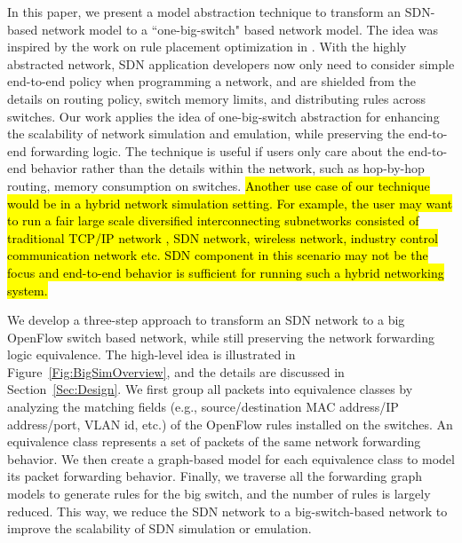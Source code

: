 In this paper, we present a model abstraction technique to transform an SDN-based network model to a ``one-big-switch" based network model.
The idea was inspired by the work on rule placement optimization in \cite{OneBigSwitchAbstraction}.
With the highly abstracted network, SDN application developers now only need to consider
simple end-to-end policy when programming a network,
and are shielded from the details on routing policy, switch memory limits,
and distributing rules across switches.
Our work applies the idea of one-big-switch abstraction for enhancing the scalability
of network simulation and emulation, while preserving the end-to-end forwarding logic.
The technique is useful if users only care about the end-to-end behavior rather than
the details within the network, such as hop-by-hop routing, memory consumption on switches.
\hl{
Another use case of our technique would be in a hybrid network simulation setting.
For example, the user may want to run a fair large scale diversified
interconnecting subnetworks consisted of traditional TCP/IP network , SDN network, wireless network,
industry control communication network etc.
SDN component in this scenario may not be the focus and end-to-end behavior is sufficient
for running such a hybrid networking system.
}

We develop a three-step approach to transform an SDN network to a big OpenFlow switch based network,
while still preserving the network forwarding logic equivalence.
The high-level idea is illustrated in Figure~\ref{Fig:BigSimOverview},
and the details are discussed in Section~\ref{Sec:Design}.
We first group all packets into equivalence classes by analyzing the matching fields
(e.g., source/destination MAC address/IP address/port, VLAN id, etc.)
of the OpenFlow rules installed on the switches.
An equivalence class represents a set of packets of the same network forwarding behavior.
We then create a graph-based model for each equivalence class to model its packet forwarding behavior.
Finally, we traverse all the forwarding graph models to generate rules for the big switch,
and the number of rules is largely reduced.
This way, we reduce the SDN network to a big-switch-based network to
improve the scalability of SDN simulation or emulation.

